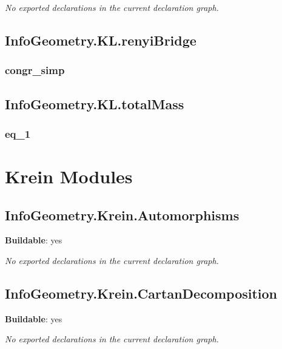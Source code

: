 \noindent\emph{No exported declarations in the current declaration graph.}

\section{InfoGeometry.KL.renyiBridge}

\subsection*{congr_simp}

\begin{theorem}[blueprint="infogeometry:kl:renyibridge:congr_simp"]
\end{theorem}

\section{InfoGeometry.KL.totalMass}

\subsection*{eq_1}

\begin{theorem}[blueprint="infogeometry:kl:totalmass:eq_1"]
\end{theorem}

\chapter{Krein Modules}

\section{InfoGeometry.Krein.Automorphisms}

\noindent\textbf{Buildable}: yes

\noindent\emph{No exported declarations in the current declaration graph.}

\section{InfoGeometry.Krein.CartanDecomposition}

\noindent\textbf{Buildable}: yes

\noindent\emph{No exported declarations in the current declaration graph.}

